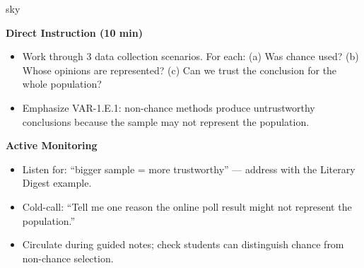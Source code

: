 \documentclass[10pt]{article}
\begin{document}
\begin{skillbox}{sky}
\begin{minipage}[t]{0.48\linewidth}
    \textbf{Direct Instruction (10 min)}
    \begin{itemize}
        \item Work through 3 data collection scenarios. For each: (a) Was chance used?
              (b) Whose opinions are represented? (c) Can we trust the conclusion for
              the whole population?
        \item Emphasize VAR-1.E.1: non-chance methods produce untrustworthy conclusions
              because the sample may not represent the population.
    \end{itemize}
\end{minipage}
\hfill
\begin{minipage}[t]{0.48\linewidth}
    \textbf{Active Monitoring}
    \begin{itemize}
        \item Listen for: ``bigger sample = more trustworthy'' --- address with the
              Literary Digest example.
        \item Cold-call: ``Tell me one reason the online poll result might not represent
              the population.''
        \item Circulate during guided notes; check students can distinguish chance from
              non-chance selection.
    \end{itemize}
\end{minipage}
\end{skillbox}
\end{document}
